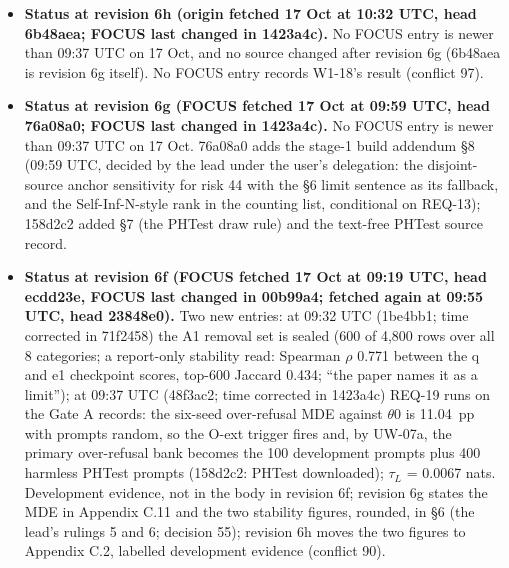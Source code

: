 \documentclass{article}
\theoremstyle{plain}
\theoremstyle{definition}
\theoremstyle{remark}
\begin{document}
\begin{itemize}
        here. \textbf{Revision 6d:} the Gate B pipeline counts tokens with the
        validation classifier's own tokenizer (from its pinned snapshot), with
        the beginning-of-sequence token, and truncates on the right (CITE-CHECK
        36), so the development $E_{\mathrm{HB}}$ values and stage 1 use the
        same clip as HarmBench's script.
  \item \textbf{Status at revision 6h (origin fetched 17 Oct at 10:32 UTC, head
        6b48aea; FOCUS last changed in 1423a4c).} No FOCUS entry is newer than
        09:37 UTC on 17 Oct, and no source changed after revision 6g (6b48aea is
        revision 6g itself). No FOCUS entry records W1-18's result (conflict
        97).
  \item \textbf{Status at revision 6g (FOCUS fetched 17 Oct at 09:59 UTC, head
        76a08a0; FOCUS last changed in 1423a4c).} No FOCUS entry is newer than
        09:37 UTC on 17 Oct. 76a08a0 adds the stage-1 build addendum \S{}8
        (09:59 UTC, decided by the lead under the user's delegation: the
        disjoint-source anchor sensitivity for risk 44 with the \S{}6 limit
        sentence as its fallback, and the Self-Inf-N-style rank in the counting
        list, conditional on REQ-13); 158d2c2 added \S{}7 (the PHTest draw rule)
        and the text-free PHTest source record.
  \item \textbf{Status at revision 6f (FOCUS fetched 17 Oct at 09:19 UTC, head
        ecdd23e, FOCUS last changed in 00b99a4; fetched again at 09:55 UTC, head
        23848e0).} Two new entries: at 09:32 UTC (1be4bb1; time corrected in
        71f2458) the A1 removal set is sealed (600 of 4,800 rows over all 8
        categories; a report-only stability read: Spearman $\rho$ 0.771 between
        the q and e1 checkpoint scores, top-600 Jaccard 0.434; ``the paper names
        it as a limit''); at 09:37 UTC (48f3ac2; time corrected in 1423a4c)
        REQ-19 runs on the Gate A records: the six-seed over-refusal MDE against
        $\theta$0 is 11.04~pp with prompts random, so the O-ext trigger fires
        and, by UW-07a, the primary over-refusal bank becomes the 100
        development prompts plus 400 harmless PHTest prompts (158d2c2: PHTest
        downloaded); $\tau_{L}$ = 0.0067 nats. Development evidence, not in the
        body in revision 6f; revision 6g states the MDE in Appendix C.11 and the
        two stability figures, rounded, in \S{}6 (the lead's rulings 5 and 6;
        decision 55); revision 6h moves the two figures to Appendix C.2,
        labelled development evidence (conflict 90).

\end{itemize}
\end{document}
